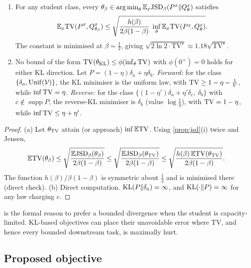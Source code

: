 \begin{proposition}\label{prop:agnostic}
\Pv
\begin{enumerate}[label=(\alph*),nosep]
\item For any student class, every $\theta_\beta\in\operatorname*{arg\,min}_\theta\mathbb{E}_x\mathrm{JSD}_\beta(P^{x}\|Q^{x}_{\theta})$ satisfies
\[
\mathbb{E}_x\mathrm{TV}(P^{x},Q^x_{\theta_\beta})\le\sqrt{\frac{h(\beta)}{2\beta(1-\beta)}\;\inf_\theta\mathbb{E}_x\mathrm{TV}(P^{x},Q^{x}_{\theta})} .
\]
The constant is minimised at $\beta=\frac12$, giving $\sqrt{2\ln2\cdot\mathrm{TV}^\star}\approx1.18\sqrt{\mathrm{TV}^\star}$.
\item No bound of the form $\mathrm{TV}(\theta_{\mathrm{KL}})\le\phi(\inf_\theta\mathrm{TV})$ with $\phi(0^+)=0$ holds for either KL
direction. Let $P=(1-\eta)\delta_a+\eta\delta_b$.
\emph{Forward:} for the class $\{\delta_a,\mathrm{Unif}(\mathcal{V})\}$, the KL minimiser is the uniform law, with
$\mathrm{TV}\ge1-\eta-\frac1V$, while $\inf\mathrm{TV}=\eta$.
\emph{Reverse:} for the class $\{(1-\eta')\delta_a+\eta'\delta_c,\ \delta_b\}$ with $c\notin\operatorname{supp}P$, the
reverse-KL minimiser is $\delta_b$ (value $\log\frac1\eta$), with $\mathrm{TV}=1-\eta$, while $\inf\mathrm{TV}\le\eta+\eta'$.
\end{enumerate}
\end{proposition}
\begin{proof}
(a) Let $\theta_{\mathrm{TV}}$ attain (or approach) $\inf\mathbb{E}\mathrm{TV}$. Using \cref{prop:jsd}(i) twice and Jensen,
\[
\mathbb{E}\mathrm{TV}(\theta_\beta)\le\sqrt{\frac{\mathbb{E}\mathrm{JSD}_\beta(\theta_\beta)}{2\beta(1-\beta)}}\le\sqrt{\frac{\mathbb{E}\mathrm{JSD}_\beta(\theta_{\mathrm{TV}})}{2\beta(1-\beta)}}\le\sqrt{\frac{h(\beta)\,\mathbb{E}\mathrm{TV}(\theta_{\mathrm{TV}})}{2\beta(1-\beta)}}.
\]
The function $h(\beta)/\beta(1-\beta)$ is symmetric about $\frac12$ and is minimised there (direct check).
(b) Direct computation. $\mathrm{KL}(P\|\delta_a)=\infty$, and $\mathrm{KL}(\cdot\|P)=\infty$ for any law charging $c$.
\end{proof}

\noindent
{} is the formal reason to prefer a bounded divergence when the student is
capacity-limited. KL-based objectives can place their unavoidable error where TV, and hence every bounded
downstream task, is maximally hurt.

\subsection{Proposed objective}\label{sec:proposal}

